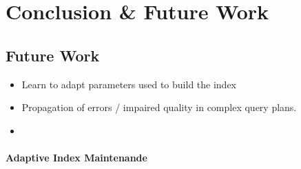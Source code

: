 \chapter{Conclusion \& Future Work}
\label{chapter:conclusion}


\section{Future Work}

\begin{itemize}
    \item Learn to adapt parameters used to build the index
    \item Propagation of errors / impaired quality in complex query plans.
    \item 
\end{itemize}

\subsubsection{Adaptive Index Maintenande}
